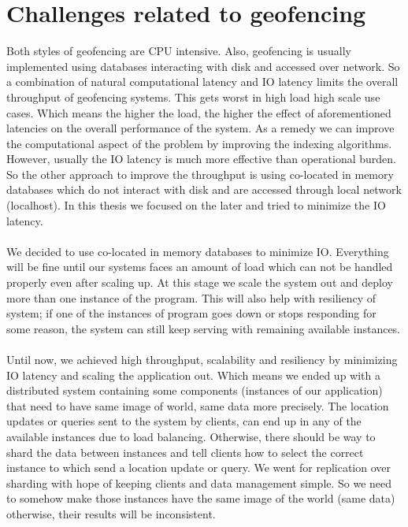 \documentclass[a4]{report}
\begin{document}
    \section{Challenges related to geofencing}
    Both styles of geofencing are CPU intensive.
    Also, geofencing is usually implemented using databases interacting with disk and accessed over network.
    So a combination of natural computational latency and IO latency limits the overall throughput of geofencing systems.
    This gets worst in high load high scale use cases.
    Which means the higher the load, the higher the effect of aforementioned latencies on the overall performance
    of the system.
    As a remedy we can improve the computational aspect of the problem by improving the indexing algorithms.
    However, usually the IO latency is much more effective than operational burden.
    So the other approach to improve the throughput is using co-located in memory databases which do not interact
    with disk and are accessed through local network (localhost).
    In this thesis we focused on the later and tried to minimize the IO latency.

    \paragraph{}
    We decided to use co-located in memory databases to minimize IO.
    Everything will be fine until our systems faces an amount of load which can not be handled properly even after scaling up.
    At this stage we scale the system out and deploy more than one instance of the program.
    This will also help with resiliency of system;
    if one of the instances of program goes down or stops responding for some reason, the system can still keep
    serving with remaining available instances.

    \paragraph{}
    Until now, we achieved high throughput, scalability and resiliency by minimizing IO latency and scaling the
    application out.
    Which means we ended up with a distributed system containing some components (instances of our application) that
    need to have same image of world, same data more precisely.
    The location updates or queries sent to the system by clients, can end up in any of the available instances due
    to load balancing.
    Otherwise, there should be way to shard the data between instances and tell clients how to select the correct
    instance to which send a location update or query.
    We went for replication over sharding with hope of keeping clients and data management simple.
    So we need to somehow make those instances have the same image of the world (same data) otherwise, their results
    will be inconsistent.
\end{document}
